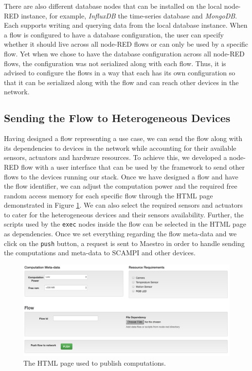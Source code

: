 \noindent There are also different  database nodes that can be installed on the local node-RED instance, for example, \textit{InfluxDB} the time-series database and \textit{MongoDB}. Each supports writing and querying data from the local database instance. When a flow is configured to have a database configuration, the user can specify whether it should live across all node-RED flows or can  only be used by a specific flow.  Yet when we chose to have the database configuration across all node-RED flows, the configuration was not serialized along with each flow. Thus, it is advised to configure the flows in a way that each has its own configuration so that it can be serialized along with the flow and can reach other devices in the network.\\


\subsection{Sending the Flow to Heterogeneous Devices}


\noindent Having designed a flow representing a use case, we can send the flow along with its dependencies to devices in the network while accounting for their available sensors, actuators  and hardware resources. To achieve this, we developed a node-RED flow with  a user interface  that can be used by the framework to send other flows to the devices running our stack. Once we have designed a flow and have the flow identifier, we can adjust the computation power and the required free random access memory for each specific flow through the HTML page demonstrated in Figure \ref{fig:html-publish}. We can also select the required sensors and actuators to cater for the heterogeneous devices and their sensors availability. Further, the scripts used by the \verb|exec| nodes inside the flow can be selected in the HTML page as dependencies. Once we set everything regarding the flow meta-data and we click on the \verb|push| button, a request is sent to Maestro in order to handle sending the computations and meta-data to SCAMPI and other devices.
\begin{figure}[H]
\centering
\includegraphics[scale=0.5]{images/html-publish.png}
\caption{The HTML page used to publish computations.}
\label{fig:html-publish}
\end{figure}

